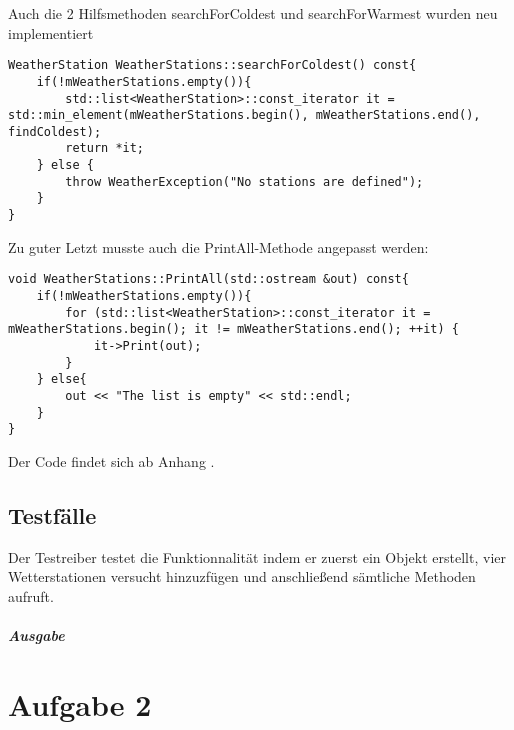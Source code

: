 \documentclass[a4paper,oneside,openany]{tufte-book}
\begin{document}
Auch die 2 Hilfsmethoden searchForColdest und searchForWarmest wurden neu implementiert

\begin{fullwidth} \begin{lstlisting}[caption=Implementierung der searchForColdest-Methode]
WeatherStation WeatherStations::searchForColdest() const{
    if(!mWeatherStations.empty()){
        std::list<WeatherStation>::const_iterator it = std::min_element(mWeatherStations.begin(), mWeatherStations.end(), findColdest);
        return *it;
    } else {
        throw WeatherException("No stations are defined");
    }
}
\end{lstlisting} \end{fullwidth}

Zu guter Letzt musste auch die PrintAll-Methode angepasst werden:

\begin{fullwidth} \begin{lstlisting}[caption=Implementierung PrintAll]
void WeatherStations::PrintAll(std::ostream &out) const{
    if(!mWeatherStations.empty()){
        for (std::list<WeatherStation>::const_iterator it = mWeatherStations.begin(); it != mWeatherStations.end(); ++it) {
            it->Print(out);
        }
    } else{
        out << "The list is empty" << std::endl;
    }
}
\end{lstlisting} \end{fullwidth}

Der Code findet sich ab Anhang .

\section{Testf\"{a}lle}

Der Testreiber testet die Funktionnalität indem er zuerst ein Objekt erstellt, vier Wetterstationen versucht hinzuzfügen und anschließend sämtliche Methoden aufruft.
\paragraph{Ausgabe}
\begin{fullwidth}

\end{fullwidth}
\chapter{Aufgabe 2}
\end{document}
